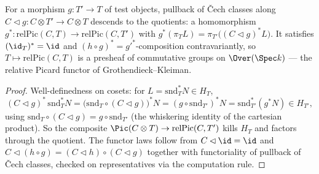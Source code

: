 \begin{definition}
  \label{def:relPicMap}
  \leanok
  For a morphism \(g \colon T' \to T\) of test objects, pullback of \v Cech classes along
  \(C \lhd g \colon C \otimes T' \to C \otimes T\) descends to the quotients: a homomorphism
  \(g^{*} \colon \mathrm{relPic}(C,T) \to \mathrm{relPic}(C,T')\) with
  \(g^{*}(\pi_T L) = \pi_{T'}\bigl((C \lhd g)^{*} L\bigr)\). It satisfies
  \((\id_T)^{*} = \id\) and \((h \circ g)^{*} = g'^{*}\)-composition contravariantly, so
  \(T \mapsto \mathrm{relPic}(C,T)\) is a presheaf of commutative groups on
  \(\Over(\Spec k)\) — the relative Picard functor of Grothendieck--Kleiman.
\end{definition}
\begin{proof}
  \leanok
  Well-definedness on cosets: for \(L = \mathrm{snd}_T^{*} N \in H_T\),
  \[
    (C \lhd g)^{*}\,\mathrm{snd}_T^{*} N
      = \bigl(\mathrm{snd}_T \circ (C \lhd g)\bigr)^{*} N
      = (g \circ \mathrm{snd}_{T'})^{*} N
      = \mathrm{snd}_{T'}^{*}(g^{*} N) \in H_{T'},
  \]
  using \(\mathrm{snd}_T \circ (C \lhd g) = g \circ \mathrm{snd}_{T'}\) (the whiskering
  identity of the cartesian product). So the composite
  \(\Pic(C \otimes T) \to \mathrm{relPic}(C,T')\) kills \(H_T\) and factors through the
  quotient. The functor laws follow from
  \(C \lhd \id = \id\) and \(C \lhd (h \circ g) = (C \lhd h) \circ (C \lhd g)\) together
  with functoriality of pullback of \v Cech classes, checked on representatives via the
  computation rule.
\end{proof}

